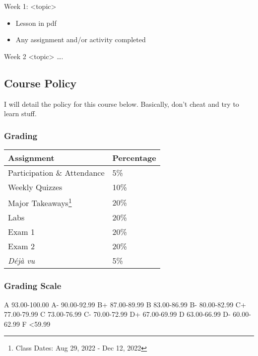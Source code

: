 \documentclass[
  letterpaper,
  DIV=11,
  numbers=noendperiod]{scrartcl}
\providecommand{\tightlist}{%
  \setlength{\itemsep}{0pt}\setlength{\parskip}{0pt}}\usepackage{longtable,booktabs,array}
\begin{document}
Week 1: \textless topic\textgreater{}

\begin{itemize}
\tightlist
\item
  Lesson in pdf
\item
  Any assignment and/or activity completed
\end{itemize}

Week 2 \textless topic\textgreater{} \ldots.

\hypertarget{sec-course-policy}{%
\subsection{Course Policy}\label{sec-course-policy}}

I will detail the policy for this course below. Basically, don't cheat
and try to learn stuff.

\hypertarget{grading}{%
\subsubsection{Grading}\label{grading}}

\begin{longtable}[]{@{}ll@{}}
\toprule()
Assignment & Percentage \\
\midrule()
\endhead
Participation \& Attendance & 5\% \\
Weekly Quizzes & 10\% \\
Major Takeaways\footnote{Class Dates: Aug 29, 2022 - Dec 12, 2022} &
20\% \\
Labs & 20\% \\
Exam 1 & 20\% \\
Exam 2 & 20\% \\
\emph{Déjà vu} & 5\% \\
\bottomrule()
\end{longtable}

\hypertarget{grading-scale}{%
\subsubsection{Grading Scale}\label{grading-scale}}

A 93.00-100.00 \textbar{} A- 90.00-92.99 B+ 87.00-89.99 \textbar{} B
83.00-86.99 \textbar{} B- 80.00-82.99 C+ 77.00-79.99 \textbar{} C
73.00-76.99 \textbar{} C- 70.00-72.99 D+ 67.00-69.99 \textbar{} D
63.00-66.99 \textbar{} D- 60.00-62.99 F \textless59.99
\end{document}
